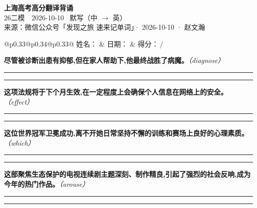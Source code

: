 \documentclass[11pt,a4paper]{article}
\newcommand{\num}[1]{\makebox[1.9em][r]{#1.}\hspace{0.3em}}
\newcommand{\wline}{\noindent\rule{\linewidth}{0.4pt}}
\newcommand{\prompt}[1]{\emph{\textcolor{tipblue}{\small（#1）}}}
\begin{document}
\pagestyle{plain}
\begin{center}
{\LARGE\bfseries 上海高考高分翻译背诵 }\\[0.25em]
{\large 26二模　2026-10-10 \quad\ 默写（中 $\to$ 英）}\\[0.35em]
{\footnotesize 来源：微信公众号「发现之旅 速来记单词」· 2026-10-10 · 赵文瀚}
\end{center}

\vspace{0.4em}
\noindent\begin{tabular}{@{}p{0.33\textwidth}@{}p{0.34\textwidth}@{}p{0.33\textwidth}@{}}
姓名：\underline{\hspace{2.0cm}} & 日期：\underline{\hspace{2.0cm}} & 得分：\underline{\hspace{1.4cm}}\,/ \\
\end{tabular}

\vspace{0.5em}

\vspace{0.8em}
\num{1}\textbf{尽管被诊断出患有抑郁,但在家人帮助下,他最终战胜了病魔。}\prompt{diagnose}

\vspace{0.3em}

\wline\vspace{0.3em}
\wline

\num{2}\textbf{这项法规将于下个月生效,在一定程度上会确保个人信息在网络上的安全。}\prompt{effect}

\vspace{0.3em}

\wline\vspace{0.3em}
\wline

\num{3}\textbf{这位世界冠军卫冕成功,离不开她日常坚持不懈的训练和赛场上良好的心理素质。}\prompt{which}

\vspace{0.3em}

\wline\vspace{0.3em}
\wline

\num{4}\textbf{这部聚焦生态保护的电视连续剧主题深刻、制作精良,引起了强烈的社会反响,成为今年的热门作品。}\prompt{arouse}

\vspace{0.3em}

\wline\vspace{0.3em}
\wline
\end{document}
